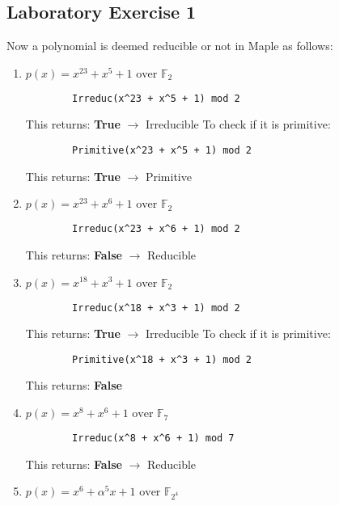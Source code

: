 \documentclass{article}
\begin{document}
\subsection{Laboratory Exercise 1}
Now a polynomial is deemed reducible or not in Maple as follows:
\begin{enumerate}
    \item $p(x) = x^23 + x^5 + 1 \text{ over } \mathbb F_2$ \\
    \begin{verbatim}
        Irreduc(x^23 + x^5 + 1) mod 2
    \end{verbatim}
    This returns: \textbf{True} $\rightarrow$ Irreducible
    To check if it is primitive:
    \begin{verbatim}
        Primitive(x^23 + x^5 + 1) mod 2
    \end{verbatim}
    This returns: \textbf{True} $\rightarrow$ Primitive
    \item $p(x) = x^23 + x^6 + 1 \text{ over } \mathbb F_2$ \\
        \begin{verbatim}
        Irreduc(x^23 + x^6 + 1) mod 2
    \end{verbatim}
    This returns: \textbf{False} $\rightarrow$ Reducible
    \item $p(x) = x^18 + x^3 + 1 \text{ over } \mathbb F_2$ \\
        \begin{verbatim}
        Irreduc(x^18 + x^3 + 1) mod 2
    \end{verbatim}
    This returns: \textbf{True} $\rightarrow$ Irreducible
    To check if it is primitive:
    \begin{verbatim}
        Primitive(x^18 + x^3 + 1) mod 2
    \end{verbatim}
    This returns: \textbf{False}
    \item $p(x) = x^8 + x^6 + 1 \text{ over } \mathbb F_7$ \\
        \begin{verbatim}
        Irreduc(x^8 + x^6 + 1) mod 7
    \end{verbatim}
    This returns: \textbf{False} $\rightarrow$ Reducible
    \item $p(x) = x^6 + \alpha^5 x + 1 \text{ over } \mathbb F_{2^4}$ \\
\end{enumerate}
\end{document}
